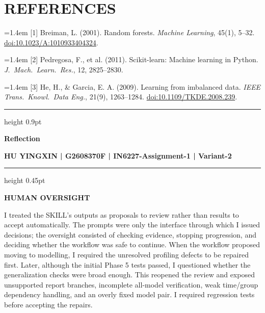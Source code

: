 \documentclass[10pt,a4paper,twocolumn]{article}
\begin{document}
\section*{REFERENCES}
{\footnotesize
\setlength{\parindent}{0pt}
\setlength{\parskip}{2pt}
\hangindent=1.4em
[1] Breiman, L. (2001). Random forests. \emph{Machine Learning}, 45(1), 5--32.
\href{https://doi.org/10.1023/A:1010933404324}{doi:10.1023/A:1010933404324}.\par
\hangindent=1.4em
[2] Pedregosa, F., et al. (2011). Scikit-learn: Machine learning in Python.
\emph{J.\ Mach.\ Learn.\ Res.}, 12, 2825--2830.\par
\hangindent=1.4em
[3] He, H., \& Garcia, E. A. (2009). Learning from imbalanced data.
\emph{IEEE Trans.\ Knowl.\ Data Eng.}, 21(9), 1263--1284.
\href{https://doi.org/10.1109/TKDE.2008.239}{doi:10.1109/TKDE.2008.239}.\par
}

\clearpage
{}
\onecolumn
\thispagestyle{reflection}
\color{accent}\hrule height 0.9pt
\vspace{9pt}
\begin{center}
  {\fontsize{17}{20}\selectfont\bfseries\color{ink}Reflection\par}
  \vspace{4pt}
  {\fontsize{9.5}{11}\selectfont\bfseries HU YINGXIN \enspace | \enspace G2608370F
    \enspace | \enspace IN6227-Assignment-1 \enspace | \enspace Variant-2\par}
\end{center}
\vspace{5pt}
\color{accent}\hrule height 0.45pt
\vspace{8pt}

\begingroup
\color{ink}
\fontsize{9.6}{11.45}\selectfont
\setlength{\parindent}{1.5em}
\setlength{\parskip}{2.2pt}

{\noindent\fontsize{11}{13}\selectfont\bfseries\color{accent}HUMAN OVERSIGHT\par}
\vspace{2pt}

I treated the SKILL's outputs as proposals to review rather than results to accept automatically. The prompts were only the interface through which I issued decisions; the oversight consisted of checking evidence, stopping progression, and deciding whether the workflow was safe to continue. When the workflow proposed moving to modelling, I required the unresolved profiling defects to be repaired first. Later, although the initial Phase 5 tests passed, I questioned whether the generalization checks were broad enough. This reopened the review and exposed unsupported report branches, incomplete all-model verification, weak time/group dependency handling, and an overly fixed model pair. I required regression tests before accepting the repairs.
\end{document}
